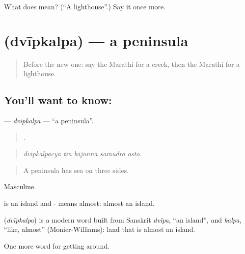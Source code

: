\begin{tcolorbox}[breakable,colback=teal!4,colframe=teal!35!black,title={Before you move on}]
What does  mean? (\textquotedblleft{}A lighthouse\textquotedblright{}.) Say it once more.
\end{tcolorbox}
\section[\texorpdfstring{\mr{द्वीपकल्प} (dvīpkalpa)}{द्वीपकल्प (dvīpkalpa)}]{ (dvīpkalpa) — a peninsula}

\label{lesson:MR-C410-dvipkalpa}



\begin{quote}
Before the new one: say the Marathi for a creek, then the Marathi for a lighthouse.
\end{quote}

\subsection*{You'll want to know: }
\textbf{} — \emph{dvīpkalpa} — \textquotedblleft{}a peninsula\textquotedblright{}.

\begin{quote}
    .
\end{quote}

\begin{quote}
\emph{dvīpkalpācyā tīn bājūnnā samudra asto.}
\end{quote}

\begin{quote}
A peninsula has sea on three sides.
\end{quote}

Masculine.

 is an island and - means almost: almost an island.

\begin{cousinweb}
\textbf{} (\emph{dvīpkalpa}) is a modern word built from Sanskrit \emph{dvīpa}, \textquotedblleft{}an island\textquotedblright{}, and \emph{kalpa}, \textquotedblleft{}like, almost\textquotedblright{} (Monier-Williams): land that is almost an island.
\end{cousinweb}

\begin{grammarlens}[title={What you've built}]
One more word for getting around.
\end{grammarlens}

